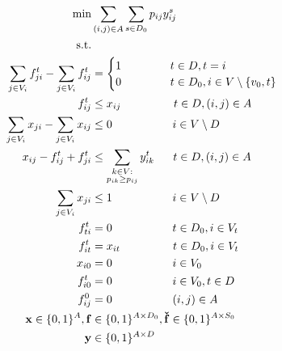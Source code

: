     \begin{subequations}
    \begin{flalign}
  \min &  \sum\limits_{(i,j) \in A} \sum\limits_{s \in D_0} p_{ij} y^s_{ij}    \\  \notag  
		   \text{s.t.}&                  && \\	\ 
 \label{con:pf2:flow}  \sum\limits_{\substack{ j \in V_i }}f^{t}_{ji}-\sum\limits_{\substack{j\in V_i}}f^{t}_{ij}    & = \begin{cases}
    1~~~~&  t\in D, t = i \\        0~~~~ \qquad             & t\in D_0, i\in V\setminus \{v_0, t\}\end{cases}     \\	
\label{con:pf2:xfrel}  f^{t}_{ij}   &\leq x_{ij}    ~~ \qquad \qquad t\in D, (i,j)\in A \\
		 	 \label{con:pf2:flowX}  \sum\limits_{\substack{ j\in V_i }}x_{ji}-\sum\limits_{\substack{j\in V_i}}x_{ij}    & \leq 0~~~~    \qquad\qquad			  i\in V\setminus D \\			 			   	
		  \label{con:pf2:yvar} x_{ij} -f^t_{ij}+f^t_{ji}  &\leq \sum\limits_{\substack{k\in V: \\ p_{ik}\geq p_{ij}}}y^t_{ik}   ~~\quad  t\in D, (i,j)\in A \\  		
\label{con:pf2:B}  \sum_{j\in V_i}x_{ji}&\leq 1~~~~ \qquad  \qquad i\in V\setminus D\\
\label{con:pf2:noflowFromT} f_{ti}^t&=0 ~~~~ \qquad  \qquad t\in D_0, i\in V_t   \\
\label{con:pf2:fitt=xit} f_{it}^t&=x_{it} ~~ \qquad  \qquad t\in D_0, i\in V_t \\
\label{con:pf2:xi0=0} x_{i0}&=0 ~~~~ \qquad  \qquad i\in V_0 \\
\label{con:pf2:fi0s=0} f_{i0}^t&=0 ~~~~ \qquad  \qquad i\in V_0, t\in D \\
\label{con:pf2:fij0=0} f_{ij}^0&=0 ~~~~ \qquad  \qquad (i,j)\in A \\	   			  
		    \label{con:pf2:dim}	\mathbf{x} \in \{0,1\}^{A},\mathbf{f}&\in\{0,1\}^{A \times D_0},\mathbf{\check{f}}\in\{0,1\}^{A\times S_0} \\ 
\label{con:pf2:dimy} \mathbf{y}&\in \{0,1\}^{A\times D}
    \end{flalign}~
    \end{subequations}
